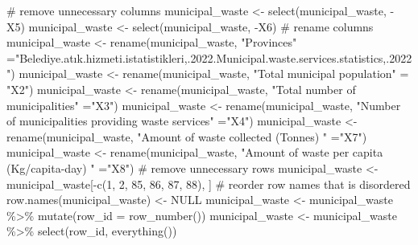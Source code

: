 \documentclass[
  11pt,
  a4paper,
  DIV=11,
  numbers=noendperiod]{scrartcl}
\newenvironment{Shaded}{\begin{snugshade}}{\end{snugshade}}
\newcommand{\AttributeTok}[1]{\textcolor[rgb]{0.40,0.45,0.13}{#1}}
\newcommand{\CommentTok}[1]{\textcolor[rgb]{0.37,0.37,0.37}{#1}}
\newcommand{\ConstantTok}[1]{\textcolor[rgb]{0.56,0.35,0.01}{#1}}
\newcommand{\DecValTok}[1]{\textcolor[rgb]{0.68,0.00,0.00}{#1}}
\newcommand{\FunctionTok}[1]{\textcolor[rgb]{0.28,0.35,0.67}{#1}}
\newcommand{\NormalTok}[1]{\textcolor[rgb]{0.00,0.23,0.31}{#1}}
\newcommand{\OtherTok}[1]{\textcolor[rgb]{0.00,0.23,0.31}{#1}}
\newcommand{\SpecialCharTok}[1]{\textcolor[rgb]{0.37,0.37,0.37}{#1}}
\newcommand{\StringTok}[1]{\textcolor[rgb]{0.13,0.47,0.30}{#1}}
\begin{document}
\begin{Shaded}
\begin{Highlighting}[]
\CommentTok{\# remove unnecessary columns}
\NormalTok{municipal\_waste }\OtherTok{\textless{}{-}} \FunctionTok{select}\NormalTok{(municipal\_waste, }\SpecialCharTok{{-}}\NormalTok{X5)    }
\NormalTok{municipal\_waste }\OtherTok{\textless{}{-}} \FunctionTok{select}\NormalTok{(municipal\_waste, }\SpecialCharTok{{-}}\NormalTok{X6)}
\CommentTok{\# rename columns}
\NormalTok{municipal\_waste }\OtherTok{\textless{}{-}} \FunctionTok{rename}\NormalTok{(municipal\_waste, }\StringTok{"Provinces"} \OtherTok{=}\StringTok{"Belediye.atık.hizmeti.istatistikleri,.2022.Municipal.waste.services.statistics,.2022"}\NormalTok{)}
\NormalTok{municipal\_waste }\OtherTok{\textless{}{-}} \FunctionTok{rename}\NormalTok{(municipal\_waste, }\StringTok{"Total municipal population"} \OtherTok{=} \StringTok{"X2"}\NormalTok{)}
\NormalTok{municipal\_waste }\OtherTok{\textless{}{-}} \FunctionTok{rename}\NormalTok{(municipal\_waste, }\StringTok{"Total number of municipalities"} \OtherTok{=}\StringTok{"X3"}\NormalTok{)}
\NormalTok{municipal\_waste }\OtherTok{\textless{}{-}} \FunctionTok{rename}\NormalTok{(municipal\_waste, }\StringTok{"Number of municipalities providing waste services"} \OtherTok{=}\StringTok{"X4"}\NormalTok{)}
\NormalTok{municipal\_waste }\OtherTok{\textless{}{-}} \FunctionTok{rename}\NormalTok{(municipal\_waste, }\StringTok{"Amount of waste collected (Tonnes) }
\StringTok{"} \OtherTok{=}\StringTok{"X7"}\NormalTok{)}
\NormalTok{municipal\_waste }\OtherTok{\textless{}{-}} \FunctionTok{rename}\NormalTok{(municipal\_waste, }\StringTok{"Amount of waste per capita (Kg/capita{-}day) }
\StringTok{"} \OtherTok{=}\StringTok{"X8"}\NormalTok{)}
\CommentTok{\# remove unnecessary rows}
\NormalTok{municipal\_waste }\OtherTok{\textless{}{-}}\NormalTok{ municipal\_waste[}\SpecialCharTok{{-}}\FunctionTok{c}\NormalTok{(}\DecValTok{1}\NormalTok{, }\DecValTok{2}\NormalTok{, }\DecValTok{85}\NormalTok{, }\DecValTok{86}\NormalTok{, }\DecValTok{87}\NormalTok{, }\DecValTok{88}\NormalTok{), ]}
\CommentTok{\# reorder row names that is disordered}
\FunctionTok{row.names}\NormalTok{(municipal\_waste) }\OtherTok{\textless{}{-}} \ConstantTok{NULL}
\NormalTok{municipal\_waste }\OtherTok{\textless{}{-}}\NormalTok{ municipal\_waste }\SpecialCharTok{\%\textgreater{}\%}
  \FunctionTok{mutate}\NormalTok{(}\AttributeTok{row\_id =} \FunctionTok{row\_number}\NormalTok{())  }
\NormalTok{municipal\_waste }\OtherTok{\textless{}{-}}\NormalTok{ municipal\_waste }\SpecialCharTok{\%\textgreater{}\%}
  \FunctionTok{select}\NormalTok{(row\_id, }\FunctionTok{everything}\NormalTok{()) }

\end{Highlighting}
\end{Shaded}
\end{document}
